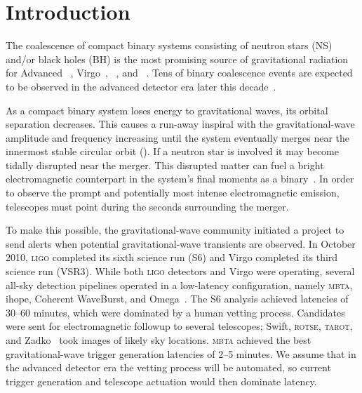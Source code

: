 \section{Introduction}
\label{sec:introduction}


 The coalescence of compact binary systems consisting of neutron stars (NS)
and/or black holes (BH) is the most promising source of gravitational radiation
for Advanced \LIGO~\cite{ALIGOWeb}, Virgo~\cite{AVirgoWeb}, \GEO~\cite{GEOWeb}, and
\LCGT~\cite{LCGTWeb}.  Tens of
binary coalescence events are expected to be observed in the
advanced detector era later this decade~\cite{Abadie:2010p10836}.

As a compact binary system loses energy to gravitational waves, its orbital separation
decreases. This causes a run-away inspiral with the gravitational-wave
amplitude and frequency increasing until the system eventually merges near the
innermost stable circular orbit (\ISCO).  If a neutron star is involved it may become tidally disrupted near the merger.
This disrupted matter can fuel a bright electromagnetic
counterpart in the system's final moments as a binary~\cite{shibata:2007}.
In order to observe the prompt and
potentially most intense electromagnetic emission, telescopes must point during the seconds surrounding the
merger.

 To make this possible, the gravitational-wave community initiated a project to send alerts when
potential gravitational-wave transients are observed.  In October 2010, \textsc{ligo} completed its sixth science run (S6) and Virgo
completed its third science run (VSR3).  While both \textsc{ligo} detectors and Virgo were
operating, several all-sky detection pipelines operated in a low-latency
configuration, namely \textsc{mbta}, ihope, Coherent WaveBurst, and Omega~\cite{HugheyGWPAW2011, S6lowlatency}.  The S6 analysis achieved latencies of 30--60 minutes, which were
dominated by a human vetting process. Candidates were sent for
electromagnetic followup to several telescopes; Swift,
\textsc{rotse}, \textsc{tarot}, and Zadko~\cite{kanner2008, HugheyGWPAW2011} took images of likely sky locations.  \textsc{mbta} achieved the best gravitational-wave trigger
generation latencies of 2--5 minutes.  We assume that
in the advanced detector era the vetting process will be automated, so current
trigger generation and telescope actuation would then dominate latency.

